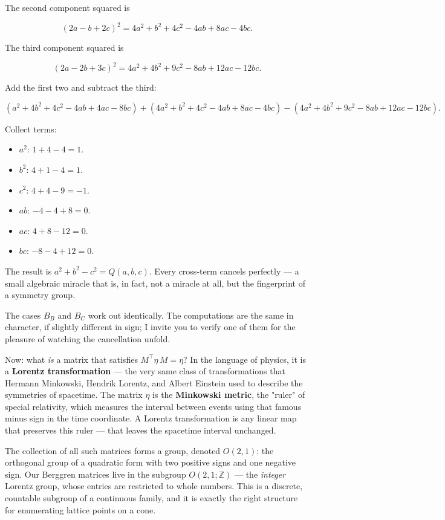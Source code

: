 \documentclass[11pt,openright,twoside]{book}
\theoremstyle{definition}
\begin{document}
The second component squared is

\[(2a - b + 2c)^2 = 4a^2 + b^2 + 4c^2 - 4ab + 8ac - 4bc.\]

The third component squared is

\[(2a - 2b + 3c)^2 = 4a^2 + 4b^2 + 9c^2 - 8ab + 12ac - 12bc.\]

Add the first two and subtract the third:

\[(a^2 + 4b^2 + 4c^2 - 4ab + 4ac - 8bc) + (4a^2 + b^2 + 4c^2 - 4ab + 8ac - 4bc) - (4a^2 + 4b^2 + 9c^2 - 8ab + 12ac - 12bc).\]

Collect terms:
\begin{itemize}[leftmargin=*]
\item $a^2$: $1 + 4 - 4 = 1$.
\item $b^2$: $4 + 1 - 4 = 1$.
\item $c^2$: $4 + 4 - 9 = -1$.
\item $ab$: $-4 - 4 + 8 = 0$.
\item $ac$: $4 + 8 - 12 = 0$.
\item $bc$: $-8 - 4 + 12 = 0$.
\end{itemize}

The result is $a^2 + b^2 - c^2 = Q(a, b, c)$. Every cross-term cancels perfectly --- a small algebraic miracle that is, in fact, not a miracle at all, but the fingerprint of a symmetry group.

The cases $B_B$ and $B_C$ work out identically. The computations are the same in character, if slightly different in sign; I invite you to verify one of them for the pleasure of watching the cancellation unfold.

Now: what \textit{is} a matrix that satisfies $M^\top \eta\, M = \eta$? In the language of physics, it is a \textbf{Lorentz transformation} --- the very same class of transformations that Hermann Minkowski, Hendrik Lorentz, and Albert Einstein used to describe the symmetries of spacetime. The matrix $\eta$ is the \textbf{Minkowski metric}, the "ruler" of special relativity, which measures the interval between events using that famous minus sign in the time coordinate. A Lorentz transformation is any linear map that preserves this ruler --- that leaves the spacetime interval unchanged.

The collection of all such matrices forms a group, denoted $O(2, 1)$: the orthogonal group of a quadratic form with two positive signs and one negative sign. Our Berggren matrices live in the subgroup $O(2, 1; \mathbb{Z})$ --- the \textit{integer} Lorentz group, whose entries are restricted to whole numbers. This is a discrete, countable subgroup of a continuous family, and it is exactly the right structure for enumerating lattice points on a cone.
\end{document}

